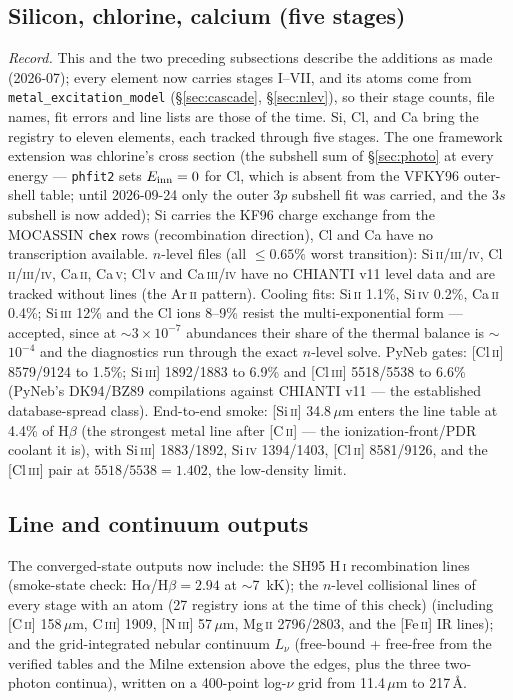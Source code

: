 \documentclass[english,a4paper]{my_memo}
\newcommand{\code}[1]{\texttt{#1}}
\begin{document}
\subsection{Silicon, chlorine, calcium (five stages)}
\emph{Record.}  This and the two preceding subsections describe the
additions as made (2026-07); every element now carries stages I--VII, and
its atoms come from \code{metal\_excitation\_model}
(\S\ref{sec:cascade}, \S\ref{sec:nlev}), so their stage counts, file names,
fit errors and line lists are those of the time.
Si, Cl, and Ca bring the registry to eleven elements, each tracked
through five stages.  The one framework extension was chlorine's cross
section (the subshell sum of \S\ref{sec:photo} at every energy ---
\code{phfit2} sets $E_{\rm inn} = 0$ for Cl, which is absent from the
VFKY96 outer-shell table; until 2026-09-24 only the outer $3p$ subshell
fit was carried, and the $3s$ subshell is now added); Si carries the KF96 charge exchange from the
MOCASSIN \code{chex} rows (recombination direction), Cl and Ca have no
transcription available.  $n$-level files (all $\leq 0.65\%$ worst
transition): Si\,\textsc{ii}/\textsc{iii}/\textsc{iv},
Cl\,\textsc{ii}/\textsc{iii}/\textsc{iv}, Ca\,\textsc{ii},
Ca\,\textsc{v}; Cl\,\textsc{v} and Ca\,\textsc{iii}/\textsc{iv} have
no CHIANTI v11 level data and are tracked without lines (the
Ar\,\textsc{ii} pattern).  Cooling fits: Si\,\textsc{ii} 1.1\%,
Si\,\textsc{iv} 0.2\%, Ca\,\textsc{ii} 0.4\%; Si\,\textsc{iii} 12\%
and the Cl ions 8--9\% resist the multi-exponential form --- accepted,
since at $\sim$$3{\times}10^{-7}$ abundances their share of the
thermal balance is $\sim$$10^{-4}$ and the diagnostics run through the
exact $n$-level solve.  PyNeb gates: [Cl\,\textsc{ii}] 8579/9124 to
1.5\%; Si\,\textsc{iii}] 1892/1883 to 6.9\% and [Cl\,\textsc{iii}]
5518/5538 to 6.6\% (PyNeb's DK94/BZ89 compilations against CHIANTI
v11 --- the established database-spread class).  End-to-end smoke:
[Si\,\textsc{ii}] 34.8\,$\mu$m enters the line table at 4.4\% of
H$\beta$ (the strongest metal line after [C\,\textsc{ii}] ---
the ionization-front/PDR coolant it is), with
Si\,\textsc{iii}] 1883/1892, Si\,\textsc{iv} 1394/1403,
[Cl\,\textsc{ii}] 8581/9126, and the [Cl\,\textsc{iii}] pair at
$5518/5538 = 1.402$, the low-density limit.

\subsection{Line and continuum outputs}
The converged-state outputs now include: the SH95 H\,\textsc{i}
recombination lines (smoke-state check: H$\alpha$/H$\beta = 2.94$ at
$\sim$7~kK); the $n$-level collisional lines of every stage with an atom
(27 registry ions at the time of this check)
(including [C\,\textsc{ii}] 158\,$\mu$m, C\,\textsc{iii}] 1909,
[N\,\textsc{iii}] 57\,$\mu$m, Mg\,\textsc{ii} 2796/2803, and the
[Fe\,\textsc{ii}] IR lines); and the grid-integrated nebular
continuum $L_\nu$ (free-bound + free-free from the verified tables and
the Milne extension above the edges, plus the three two-photon
continua), written on a 400-point log-$\nu$ grid from 11.4\,$\mu$m to
217\,\AA.
\end{document}
